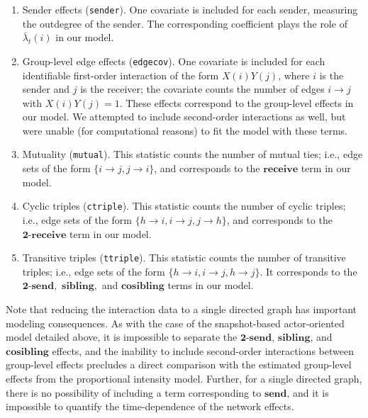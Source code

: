 \documentclass[final]{statsoc}
\begin{document}
\begin{enumerate}
  \item Sender effects (\texttt{sender}).  One covariate is included for each sender,
  measuring the outdegree of the sender.  The corresponding coefficient plays the role of $\bar \lambda_t(i)$ in our model.

  \item Group-level edge effects (\texttt{edgecov}).  One covariate is included for each
identifiable first-order interaction of the form $X(i) Y(j)$, where $i$ is the
sender and $j$ is the receiver; the covariate counts the number of edges $i
\to j$ with $X(i) Y(j) = 1$.  These effects correspond to the group-level
effects in our model.  We attempted to include second-order
interactions as well, but were unable (for computational reasons) to fit the model with these terms.

  \item Mutuality (\texttt{mutual}).  This statistic counts the number of
mutual ties; i.e., edge sets of the form $\{ i \to j, j \to i \}$, and corresponds to the
$\textbf{receive}$ term in our model.

  \item Cyclic triples (\texttt{ctriple}).  This statistic counts the number of
cyclic triples; i.e., edge sets of the form $\{ h \to i, i \to j, j \to h \}$, and
corresponds to the $\textbf{2-receive}$ term in our model.

  \item Transitive triples (\texttt{ttriple}).  This statistic counts the
number of transitive triples; i.e., edge sets of the form $\{ h \to i, i \to j, h
\to j \}$.  It corresponds to the $\textbf{2-send},$ $\textbf{sibling},$
and $\textbf{cosibling}$ terms in our model.
\end{enumerate}

\noindent
Note that reducing the interaction data to a single directed graph has
important modeling consequences.  As with the case of the snapshot-based
actor-oriented model detailed above, it is impossible to separate the
$\textbf{2-send}$, $\textbf{sibling}$, and $\textbf{cosibling}$ effects, and the inability to include second-order interactions between group-level effects precludes a direct comparison with the estimated group-level effects from the proportional intensity model.
Further, for a single directed graph, there is no possibility of including a
term corresponding to $\textbf{send}$, and it is impossible to quantify the
time-dependence of the network effects.
\end{document}
